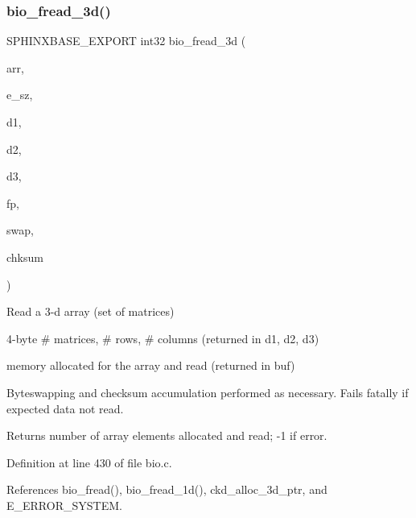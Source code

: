 \mbox{\label{bio_8h_aca6a6b71d02b9e5ca6b136a28640e0c1}} 
\subsubsection{bio\+\_\+fread\+\_\+3d()}
{\footnotesize\ttfamily S\+P\+H\+I\+N\+X\+B\+A\+S\+E\+\_\+\+E\+X\+P\+O\+RT int32 bio\+\_\+fread\+\_\+3d (\begin{DoxyParamCaption}\item[{void $\ast$$\ast$$\ast$$\ast$}]{arr,  }\item[{size\+\_\+t}]{e\+\_\+sz,  }\item[{uint32 $\ast$}]{d1,  }\item[{uint32 $\ast$}]{d2,  }\item[{uint32 $\ast$}]{d3,  }\item[{F\+I\+LE $\ast$}]{fp,  }\item[{uint32}]{swap,  }\item[{uint32 $\ast$}]{chksum }\end{DoxyParamCaption})}



Read a 3-\/d array (set of matrices) 


\begin{DoxyItemize}
\item 4-\/byte \# matrices, \# rows, \# columns (returned in d1, d2, d3)
\item memory allocated for the array and read (returned in buf)
\end{DoxyItemize}

Byteswapping and checksum accumulation performed as necessary. Fails fatally if expected data not read. \begin{DoxyReturn}{Returns}
number of array elements allocated and read; -\/1 if error. 
\end{DoxyReturn}


Definition at line 430 of file bio.\+c.



References bio\+\_\+fread(), bio\+\_\+fread\+\_\+1d(), ckd\+\_\+alloc\+\_\+3d\+\_\+ptr, and E\+\_\+\+E\+R\+R\+O\+R\+\_\+\+S\+Y\+S\+T\+EM.

\mbox{\label{bio_8h_a144651e14134242035793d69918fd407}} 
